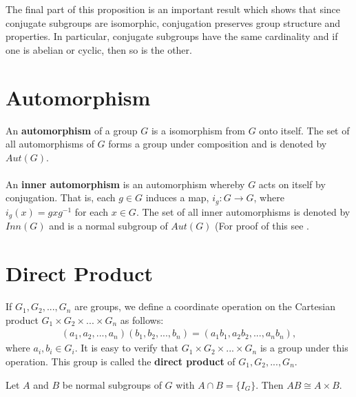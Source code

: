 The final part of this proposition is an important result which shows that since conjugate subgroups are isomorphic, conjugation preserves group structure and properties. In particular, conjugate subgroups have the same cardinality and if one is abelian or cyclic, then so is the other.

\section{Automorphism}

\begin{definition} An \textbf{automorphism} of a group $G$ is a isomorphism from $G$ onto itself. The set of all automorphisms of $G$ forms a group under composition and is denoted by $Aut(G)$.\\
\\
An \textbf{inner automorphism} is an automorphism whereby $G$ acts on itself by conjugation. That is, each $g \in G$ induces a map, $i_g : G \rightarrow G$, where $i_g(x) = g x g^{-1}$ for each $x \in G$. The set of all inner automorphisms is denoted by $Inn(G)$ and is a normal subgroup of $Aut(G)$ (For proof of this see \cite[p.104]{bhattacharya}.
\end{definition}

\section{Direct Product}

\begin{definition} If $G_1, G_2,...,G_n$ are groups, we define a coordinate operation on the Cartesian product $G_1 \times G_2 \times...\times G_n$ as follows:
\begin{align*} (a_1, a_2, ..., a_n) (b_1, b_2, ..., b_n) = (a_1 b_1, a_2 b_2, ..., a_n b_n),
\end{align*}
where $a_i, b_i \in G_i$. It is easy to verify that $G_1 \times G_2 \times...\times G_n$ is a group under this operation. This group is called the \textbf{direct product} of $G_1, G_2,...,G_n$.
\end{definition}

\begin{lemma} \label{directproductN} Let $A$ and $B$ be normal subgroups of $G$ with $A \cap B = \{ I_G \}$. Then $AB \cong A \times B$.
\end{lemma}


